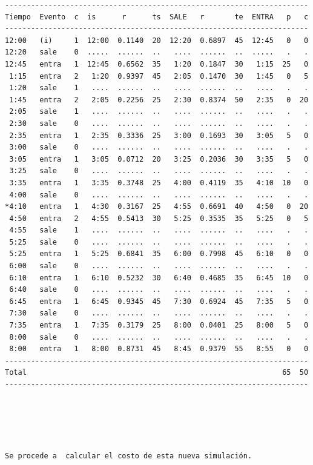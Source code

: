 \begin{verbatim}
----------------------------------------------------------------------
Tiempo  Evento  c  is      r      ts  SALE   r       te  ENTRA   p   c
----------------------------------------------------------------------
12:00   (i)     1  12:00  0.1140  20  12:20  0.6897  45  12:45   0   0
12:20   sale    0  .....  ......  ..   ....  ......  ..  .....   .   .
12:45   entra   1  12:45  0.6562  35   1:20  0.1847  30   1:15  25   0
 1:15   entra   2   1:20  0.9397  45   2:05  0.1470  30   1:45   0   5
 1:20   sale    1   ....  ......  ..   ....  ......  ..   ....   .   .
 1:45   entra   2   2:05  0.2256  25   2:30  0.8374  50   2:35   0  20
 2:05   sale    1   ....  ......  ..   ....  ......  ..   ....   .   .
 2:30   sale    0   ....  ......  ..   ....  ......  ..   ....   .   .
 2:35   entra   1   2:35  0.3336  25   3:00  0.1693  30   3:05   5   0
 3:00   sale    0   ....  ......  ..   ....  ......  ..   ....   .   .
 3:05   entra   1   3:05  0.0712  20   3:25  0.2036  30   3:35   5   0
 3:25   sale    0   ....  ......  ..   ....  ......  ..   ....   .   .
 3:35   entra   1   3:35  0.3748  25   4:00  0.4119  35   4:10  10   0
 4:00   sale    0   ....  ......  ..   ....  ......  ..   ....   .   .
*4:10   entra   1   4:30  0.3167  25   4:55  0.6691  40   4:50   0  20
 4:50   entra   2   4:55  0.5413  30   5:25  0.3535  35   5:25   0   5
 4:55   sale    1   ....  ......  ..   ....  ......  ..   ....   .   .
 5:25   sale    0   ....  ......  ..   ....  ......  ..   ....   .   .
 5:25   entra   1   5:25  0.6841  35   6:00  0.7998  45   6:10   0   0
 6:00   sale    0   ....  ......  ..   ....  ......  ..   ....   .   .
 6:10   entra   1   6:10  0.5232  30   6:40  0.4685  35   6:45  10   0
 6:40   sale    0   ....  ......  ..   ....  ......  ..   ....   .   .
 6:45   entra   1   6:45  0.9345  45   7:30  0.6924  45   7:35   5   0
 7:30   sale    0   ....  ......  ..   ....  ......  ..   ....   .   .
 7:35   entra   1   7:35  0.3179  25   8:00  0.0401  25   8:00   5   0
 8:00   sale    0   ....  ......  ..   ....  ......  ..   ....   .   .
 8:00   entra   1   8:00  0.8731  45   8:45  0.9379  55   8:55   0   0
----------------------------------------------------------------------
Total                                                           65  50
----------------------------------------------------------------------





Se procede a  calcular el costo de esta nueva simulación.




\end{verbatim}
